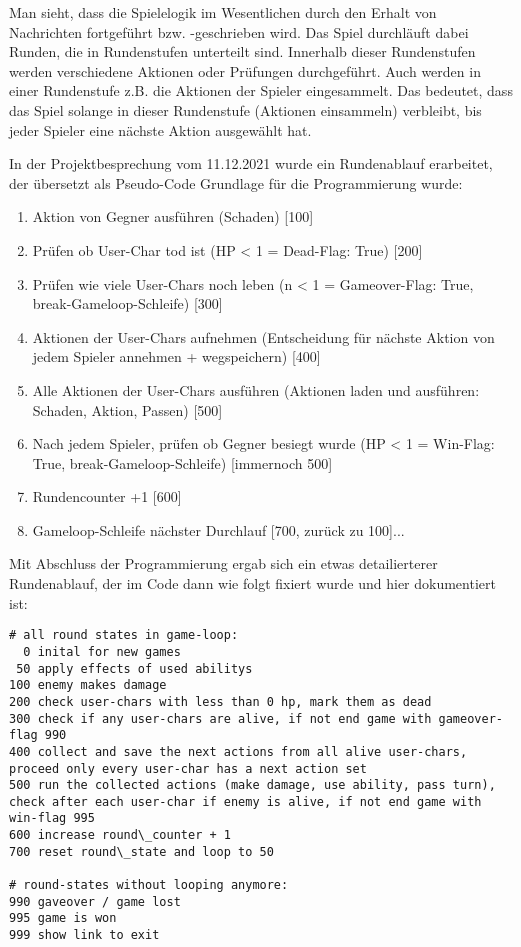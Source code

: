 Man sieht, dass die Spielelogik im Wesentlichen durch den Erhalt von Nachrichten fortgeführt bzw. -geschrieben wird.  Das Spiel durchläuft dabei Runden, die in Rundenstufen unterteilt sind. Innerhalb dieser Rundenstufen werden verschiedene Aktionen oder Prüfungen durchgeführt. Auch werden in einer Rundenstufe z.B. die Aktionen der Spieler eingesammelt. Das bedeutet, dass das Spiel solange in dieser Rundenstufe (Aktionen einsammeln) verbleibt, bis jeder Spieler eine nächste Aktion ausgewählt hat. 

In der Projektbesprechung vom 11.12.2021 wurde ein Rundenablauf erarbeitet, der übersetzt als Pseudo-Code Grundlage für die Programmierung wurde: 

\begin{enumerate}
    \item Aktion von Gegner ausführen (Schaden) [100]
    \item Prüfen ob User-Char tod ist (HP < 1 = Dead-Flag: True) [200]
    \item Prüfen wie viele User-Chars noch leben (n < 1 = Gameover-Flag: True, break-Gameloop-Schleife) [300]
    \item Aktionen der User-Chars aufnehmen (Entscheidung für nächste Aktion von jedem Spieler annehmen + wegspeichern) [400]
    \item Alle Aktionen der User-Chars ausführen (Aktionen laden und ausführen: Schaden, Aktion, Passen) [500]
    \item Nach jedem Spieler, prüfen ob Gegner besiegt wurde (HP < 1 = Win-Flag: True, break-Gameloop-Schleife) [immernoch 500]
    \item Rundencounter +1 [600]
    \item Gameloop-Schleife nächster Durchlauf [700, zurück zu 100]...
\end{enumerate}

Mit Abschluss der Programmierung ergab sich ein etwas detailierterer Rundenablauf, der im Code dann wie folgt fixiert wurde und hier dokumentiert ist: 


\begin{lstlisting}
# all round states in game-loop:
  0 inital for new games
 50 apply effects of used abilitys
100 enemy makes damage
200 check user-chars with less than 0 hp, mark them as dead
300 check if any user-chars are alive, if not end game with gameover-flag 990
400 collect and save the next actions from all alive user-chars, proceed only every user-char has a next action set
500 run the collected actions (make damage, use ability, pass turn), check after each user-char if enemy is alive, if not end game with win-flag 995
600 increase round\_counter + 1
700 reset round\_state and loop to 50

# round-states without looping anymore:
990 gaveover / game lost
995 game is won
999 show link to exit
\end{lstlisting}

